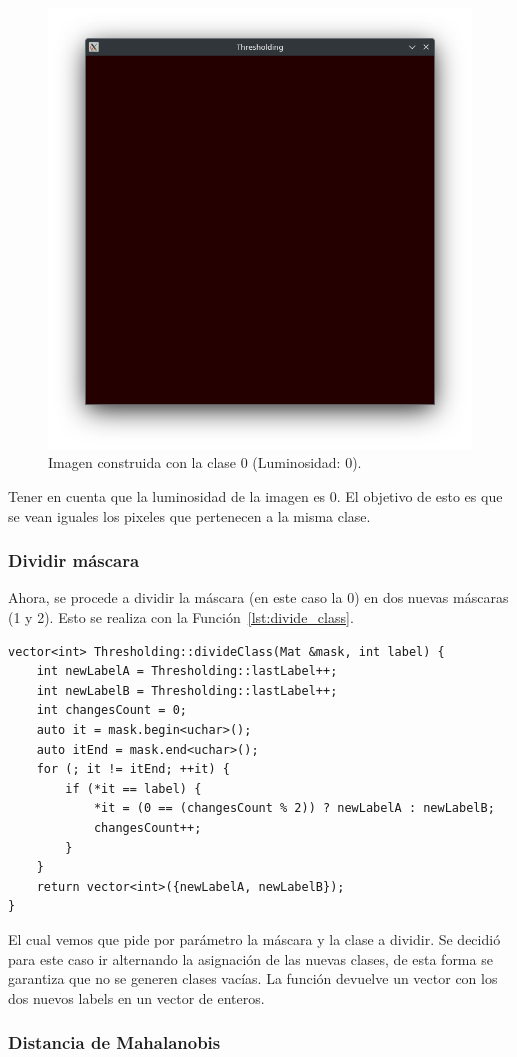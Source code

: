 \begin{figure}[H]
    \centering
    \includegraphics[width=.35\textwidth]{./latex/img/m0}
    \caption{Imagen construida con la clase 0 (Luminosidad: 0).}
    \label{fig:m0}
\end{figure}

Tener en cuenta que la luminosidad de la imagen es 0.
El objetivo de esto es que se vean iguales los pixeles que pertenecen a la misma clase.

\subsubsection{Dividir máscara}\label{subsubsec:split-mask}

Ahora, se procede a dividir la máscara (en este caso la 0) en dos nuevas máscaras (1 y 2).
Esto se realiza con la Función~\ref{lst:divide_class}.

\begin{lstlisting}[float=H,caption={Divide Class},label={lst:divide_class}]
vector<int> Thresholding::divideClass(Mat &mask, int label) {
    int newLabelA = Thresholding::lastLabel++;
    int newLabelB = Thresholding::lastLabel++;
    int changesCount = 0;
    auto it = mask.begin<uchar>();
    auto itEnd = mask.end<uchar>();
    for (; it != itEnd; ++it) {
        if (*it == label) {
            *it = (0 == (changesCount % 2)) ? newLabelA : newLabelB;
            changesCount++;
        }
    }
    return vector<int>({newLabelA, newLabelB});
}
\end{lstlisting}

El cual vemos que pide por parámetro la máscara y la clase a dividir.
Se decidió para este caso ir alternando la asignación de las nuevas clases, de esta forma se garantiza que no se generen clases vacías.
La función devuelve un vector con los dos nuevos labels en un vector de enteros.

\subsubsection{Distancia de Mahalanobis}\label{subsubsec:mahalanobis}

